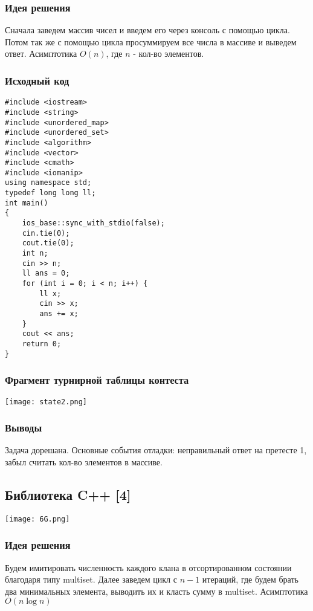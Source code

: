 \documentclass[12pt]{article}
\begin{document}
\subsubsection*{Идея решения}
Сначала заведем массив чисел и введем его через консоль с помощью цикла. Потом так же с помощью цикла просуммируем все числа в массиве и выведем ответ. Асимптотика $O(n)$, где $n$ - кол-во элементов. 
\subsubsection*{Исходный код}
\begin{lstlisting}
#include <iostream>
#include <string>
#include <unordered_map>
#include <unordered_set>
#include <algorithm>
#include <vector>
#include <cmath>
#include <iomanip>
using namespace std;
typedef long long ll;
int main()
{
	ios_base::sync_with_stdio(false);
	cin.tie(0);
	cout.tie(0);
	int n;
	cin >> n;
	ll ans = 0;
	for (int i = 0; i < n; i++) {
		ll x;
		cin >> x;
		ans += x;
	}
	cout << ans;
	return 0;
}
\end{lstlisting}
\subsubsection*{Фрагмент турнирной таблицы контеста}
\begin{center}
\texttt{[image: state2.png]}\newline\noindent
\end{center}

\subsubsection*{Выводы}
Задача дорешана. Основные события отладки: неправильный ответ на претесте 1, забыл считать кол-во элементов в массиве.
\subsection*{Библиотека C++ [4]}
\begin{center}
\texttt{[image: 6G.png]}
\end{center}
\subsubsection*{Идея решения}
Будем имитировать численность каждого клана в отсортированном состоянии благодаря типу multiset. Далее заведем цикл с $n-1$ итераций, где будем брать два минимальных элемента, выводить их и класть сумму в multiset. Асимптотика  $O(n\log{}n)$
\end{document}

